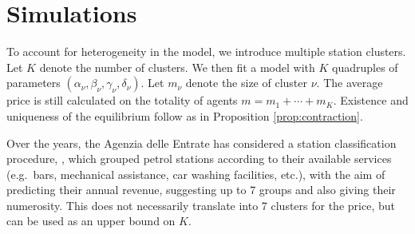 \documentclass[graybox]{svmult}
\begin{document}

\section{Simulations}
\label{sec:simulations}

To account for heterogeneity in the model, we introduce multiple station clusters. Let $K$ denote the number of clusters. We then fit a model with $K$ quadruples of parameters $(\alpha_\nu,\beta_\nu,\gamma_\nu,\delta_\nu)$. Let $m_\nu$ denote the size of cluster $\nu$. The average price is still calculated on the totality of agents $m=m_1+\cdots+m_K$. Existence and uniqueness of the equilibrium follow as in  Proposition \ref{prop:contraction}.

Over the years, the Agenzia delle Entrate has considered a station classification procedure, \cite{Age}, which grouped petrol stations according to their available services (e.g.\ bars, mechanical assistance, car washing facilities, etc.), with the aim of predicting their annual revenue, suggesting up to 7 groups and also giving their numerosity. This does not necessarily translate into 7 clusters for the price, but can be used as an upper bound on $K$.
\end{document}
